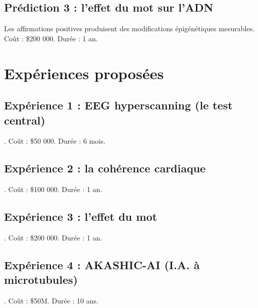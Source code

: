 \subsection{Prédiction 3 : l'effet du mot sur l'ADN}
Les affirmations positives produisent des modifications épigénétiques mesurables. Coût : \$200 000. Durée : 1 an.

\section{Expériences proposées}
\subsection{Expérience 1 : EEG hyperscanning (le test central)}. Coût : \$50 000. Durée : 6 mois.
\subsection{Expérience 2 : la cohérence cardiaque}. Coût : \$100 000. Durée : 1 an.
\subsection{Expérience 3 : l'effet du mot}. Coût : \$200 000. Durée : 1 an.
\subsection{Expérience 4 : AKASHIC-AI (I.A. à microtubules)}. Coût : \$50M. Durée : 10 ans.

